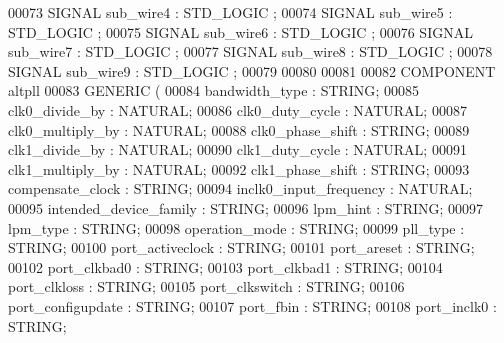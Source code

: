 \begin{DoxyCode}
{00073     \textcolor{keywordflow}{SIGNAL} \textcolor{vhdlchar}{sub_wire4}    \textcolor{vhdlchar}{:} \textcolor{comment}{STD\_LOGIC} ;
00074     \textcolor{keywordflow}{SIGNAL} \textcolor{vhdlchar}{sub_wire5}    \textcolor{vhdlchar}{:} \textcolor{comment}{STD\_LOGIC} ;
00075     \textcolor{keywordflow}{SIGNAL} \textcolor{vhdlchar}{sub_wire6}    \textcolor{vhdlchar}{:} \textcolor{comment}{STD\_LOGIC} ;
00076     \textcolor{keywordflow}{SIGNAL} \textcolor{vhdlchar}{sub_wire7}    \textcolor{vhdlchar}{:} \textcolor{comment}{STD\_LOGIC} ;
00077     \textcolor{keywordflow}{SIGNAL} \textcolor{vhdlchar}{sub_wire8}    \textcolor{vhdlchar}{:} \textcolor{comment}{STD\_LOGIC} ;
00078     \textcolor{keywordflow}{SIGNAL} \textcolor{vhdlchar}{sub_wire9}    \textcolor{vhdlchar}{:} \textcolor{comment}{STD\_LOGIC} ;
00079 
00080 
00081 
00082     \textcolor{keywordflow}{COMPONENT} altpll
00083     \textcolor{keywordflow}{GENERIC} (
00084         bandwidth\_type      : \textcolor{comment}{STRING};
00085         clk0\_divide\_by      : \textcolor{comment}{NATURAL};
00086         clk0\_duty\_cycle     : \textcolor{comment}{NATURAL};
00087         clk0\_multiply\_by        : \textcolor{comment}{NATURAL};
00088         clk0\_phase\_shift        : \textcolor{comment}{STRING};
00089         clk1\_divide\_by      : \textcolor{comment}{NATURAL};
00090         clk1\_duty\_cycle     : \textcolor{comment}{NATURAL};
00091         clk1\_multiply\_by        : \textcolor{comment}{NATURAL};
00092         clk1\_phase\_shift        : \textcolor{comment}{STRING};
00093         compensate\_clock        : \textcolor{comment}{STRING};
00094         inclk0\_input\_frequency      : \textcolor{comment}{NATURAL};
00095         intended\_device\_family      : \textcolor{comment}{STRING};
00096         lpm\_hint        : \textcolor{comment}{STRING};
00097         lpm\_type        : \textcolor{comment}{STRING};
00098         operation\_mode      : \textcolor{comment}{STRING};
00099         pll\_type        : \textcolor{comment}{STRING};
00100         port\_activeclock        : \textcolor{comment}{STRING};
00101         port\_areset     : \textcolor{comment}{STRING};
00102         port\_clkbad0        : \textcolor{comment}{STRING};
00103         port\_clkbad1        : \textcolor{comment}{STRING};
00104         port\_clkloss        : \textcolor{comment}{STRING};
00105         port\_clkswitch      : \textcolor{comment}{STRING};
00106         port\_configupdate       : \textcolor{comment}{STRING};
00107         port\_fbin       : \textcolor{comment}{STRING};
00108         port\_inclk0     : \textcolor{comment}{STRING};
}
\end{DoxyCode}
